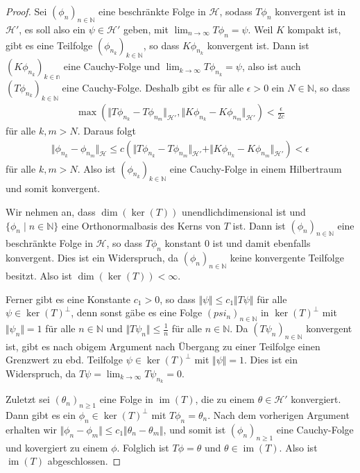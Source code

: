 \documentclass[11pt, hidelinks]{article}
\newcommand{\h}{\mathcal{H}}
\newcommand{\im}{\operatorname{im}}
\newcommand{\on}{{n \in \mathbb{N}}}
\numberwithin{conj}{section}
\begin{document}
\begin{proof}
    Sei $(\phi_n)_{n \in \mathbb{N}}$ eine beschränkte Folge in $\h$, sodass $T \phi_n$ konvergent ist in $\h'$, es soll also ein $\psi \in \h'$ geben, mit $\lim_{n\to\infty} T\phi_n = \psi$. Weil $K$ kompakt ist, gibt es eine Teilfolge $(\phi_{n_k})_{k \in \mathbb{N}}$, so dass $K \phi_{n_k}$ konvergent ist. Dann ist $(K\phi_{n_k})_{k \in \mathbb{n}}$ eine Cauchy-Folge und $\lim_{k\to\infty} T\phi_{n_k} = \psi$, also ist auch $(T\phi_{n_k})_{k\in\mathbb{N}}$ eine Cauchy-Folge. Deshalb gibt es für alle $\epsilon > 0$ ein $N\in \mathbb{N}$, so dass
    \begin{align}
        \max(\Vert T\phi_{n_k}-T\phi_{n_m} \Vert_{\h'}, \Vert K\phi_{n_k}-K\phi_{n_m} \Vert_{\h'}) < \frac{\epsilon}{2c}
    \end{align}
    für alle $k,m > N$. Daraus folgt
    \begin{align}
        \Vert \phi_{n_k} - \phi_{n_m} \Vert_\h \leq c (\Vert T\phi_{n_k}-T\phi_{n_m} \Vert_{\h'} +  \Vert K\phi_{n_k}-K\phi_{n_m} \Vert_{\h'}) < \epsilon
    \end{align}
    für alle $k,m > N$. Also ist $(\phi_{n_k})_{k \in \mathbb{N}}$ eine Cauchy-Folge in einem Hilbertraum und somit konvergent.

    Wir nehmen an, dass $\dim(\ker(T))$ unendlichdimensional ist und $\{\phi_n \;\vert\; n \in \mathbb{N}\}$ eine Orthonormalbasis des Kerns von $T$ ist. Dann ist $(\phi_n)_{n \in \mathbb{N}}$ eine beschränkte Folge in $\h$, so dass $T \phi_n$ konstant $0$ ist und damit ebenfalls konvergent. Dies ist ein Widerspruch, da $(\phi_n)_{n\in \mathbb{N}}$ keine konvergente Teilfolge besitzt. Also ist $\dim(\ker(T)) < \infty$.

    Ferner gibt es eine Konstante $c_1 > 0$, so dass $\Vert \psi \Vert \leq c_1 \Vert T\psi \Vert$ für alle $\psi \in \ker(T)^\perp$, denn sonst gäbe es eine Folge $(psi_n)_{n\in\mathbb{N}}$ in $\ker(T)^\perp$ mit $\Vert \psi_n \Vert = 1$ für alle $n \in \mathbb{N}$ und $\Vert T\psi_n \Vert \leq \frac{1}{n}$ für alle $n \in \mathbb{N}$. Da $(T\psi_n)_\on$ konvergent ist, gibt es nach obigem Argument nach Übergang zu einer Teilfolge einen Grenzwert zu ebd. Teilfolge $\psi \in \ker(T)^\perp$ mit $\Vert \psi \Vert = 1$. Dies ist ein Widerspruch, da $T \psi = \lim_{k\to\infty} T \psi_{n_k} = 0$.

    Zuletzt sei $(\theta_n)_{n \geq 1}$ eine Folge in $\im(T)$, die zu einem $\theta \in \h'$ konvergiert. Dann gibt es ein $\phi_n \in \ker(T)^\perp$ mit $T\phi_n = \theta_n$. Nach dem vorherigen Argument erhalten wir $\Vert\phi_n-\phi_m\Vert \leq c_1 \Vert \theta_n - \theta_m \Vert$, und somit ist $(\phi_n)_{n\geq 1}$ eine Cauchy-Folge und kovergiert zu einem $\phi$. Folglich ist $T\phi = \theta$ und $\theta \in \im(T)$. Also ist $\im(T)$ abgeschlossen.
\end{proof}
\end{document}
